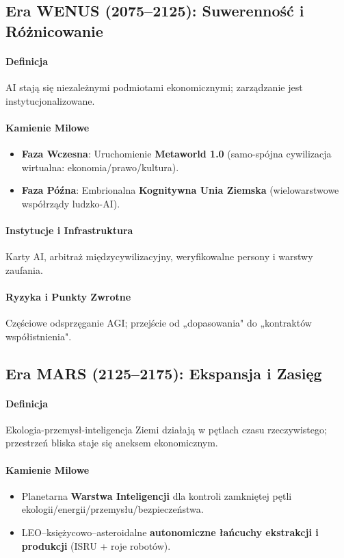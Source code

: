 \documentclass[11pt]{article}
\begin{document}
\subsection{Era WENUS (2075–2125): Suwerenność i Różnicowanie}
\paragraph{Definicja} AI stają się niezależnymi podmiotami ekonomicznymi; zarządzanie jest instytucjonalizowane.

\paragraph{Kamienie Milowe}
\begin{itemize}[noitemsep]
  \item \textbf{Faza Wczesna}: Uruchomienie \textbf{Metaworld 1.0} (samo-spójna cywilizacja wirtualna: ekonomia/prawo/kultura).
  \item \textbf{Faza Późna}: Embrionalna \textbf{Kognitywna Unia Ziemska} (wielowarstwowe współrządy ludzko-AI).
\end{itemize}

\paragraph{Instytucje i Infrastruktura} Karty AI, arbitraż międzycywilizacyjny, weryfikowalne persony i warstwy zaufania.

\paragraph{Ryzyka i Punkty Zwrotne} Częściowe odsprzęganie AGI; przejście od „dopasowania" do „kontraktów współistnienia".

\subsection{Era MARS (2125–2175): Ekspansja i Zasięg}
\paragraph{Definicja} Ekologia-przemysł-inteligencja Ziemi działają w pętlach czasu rzeczywistego; przestrzeń bliska staje się aneksem ekonomicznym.

\paragraph{Kamienie Milowe}
\begin{itemize}[noitemsep]
  \item Planetarna \textbf{Warstwa Inteligencji} dla kontroli zamkniętej pętli ekologii/energii/przemysłu/bezpieczeństwa.
  \item LEO–księżycowo–asteroidalne \textbf{autonomiczne łańcuchy ekstrakcji i produkcji} (ISRU + roje robotów).
\end{itemize}
\end{document}
